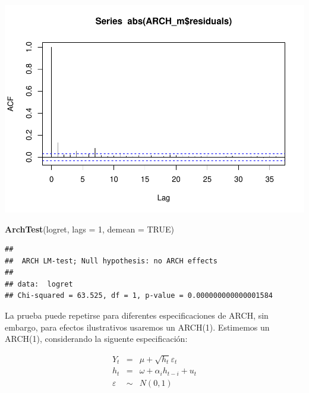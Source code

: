 \documentclass[
]{book}
\newenvironment{Shaded}{\begin{snugshade}}{\end{snugshade}}
\newcommand{\AttributeTok}[1]{\textcolor[rgb]{0.13,0.29,0.53}{#1}}
\newcommand{\ConstantTok}[1]{\textcolor[rgb]{0.56,0.35,0.01}{#1}}
\newcommand{\DecValTok}[1]{\textcolor[rgb]{0.00,0.00,0.81}{#1}}
\newcommand{\FunctionTok}[1]{\textcolor[rgb]{0.13,0.29,0.53}{\textbf{#1}}}
\newcommand{\NormalTok}[1]{#1}
\newcommand{\SpecialCharTok}[1]{\textcolor[rgb]{0.81,0.36,0.00}{\textbf{#1}}}
\begin{document}
\begin{Shaded}
\end{Shaded}

\includegraphics{Notas-Series-Tiempo_files/figure-latex/ArchTest-2.pdf}

\begin{Shaded}
\begin{Highlighting}[]
\FunctionTok{ArchTest}\NormalTok{(logret, }\AttributeTok{lags =} \DecValTok{1}\NormalTok{, }\AttributeTok{demean =} \ConstantTok{TRUE}\NormalTok{)}
\end{Highlighting}
\end{Shaded}

\begin{verbatim}
## 
##  ARCH LM-test; Null hypothesis: no ARCH effects
## 
## data:  logret
## Chi-squared = 63.525, df = 1, p-value = 0.000000000000001584
\end{verbatim}

La prueba puede repetirse para diferentes especificaciones de ARCH, sin embargo, para efectos ilustrativos usaremos un ARCH(1). Estimemos un ARCH(1), considerando la siguente especificación:

\begin{eqnarray*}
    Y_t & = & \mu+\sqrt{h_t}\varepsilon_t \\
    h_t & = & \omega+\alpha_ih_{t-i}+u_t \\
    \varepsilon & \sim & N(0,1)
\end{eqnarray*}
\end{document}
